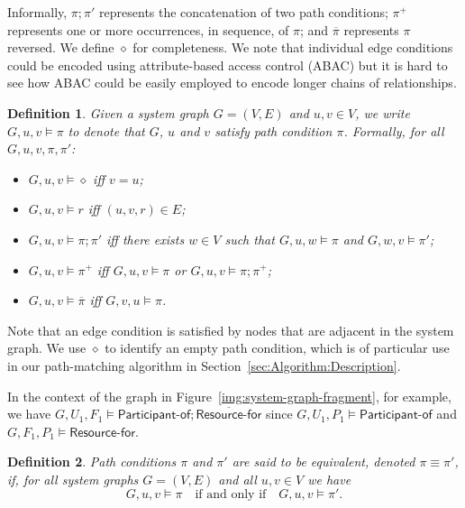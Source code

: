 \documentclass{article}
\newtheorem{definition}{Definition}
\newcommand{\comp}{\mathbin{;}}
\begin{document}
Informally, $\pi \comp \pi'$ represents the concatenation of two path conditions; $\pi^+$ represents one or more occurrences, in sequence, of $\pi$; and $\overline{\pi}$ represents $\pi$ reversed.
We define $\diamond$ for completeness.
We note that individual edge conditions could be encoded using attribute-based access control (ABAC) but it is hard to see how ABAC could be easily employed to encode longer chains of relationships.

\begin{definition}\label{def:path-condition-semantics}
 Given a system graph $G = (V,E)$ and $u,v \in V$, we write $G,u,v \models \pi$ to denote that  $G$, $u$ and $v$ \emph{satisfy path condition} $\pi$.
 Formally, for all $G,u,v,\pi,\pi'$:
    \begin{itemize}
        \item $G,u,v \models \diamond$ iff $v = u$;
        \item $G,u,v \models r$ iff $(u,v,r) \in E$;
        \item $G,u,v \models \pi \comp \pi'$ iff there exists $w \in V$ such that $G,u,w \models \pi$ and $G,w,v \models \pi'$;
        \item $G,u,v \models \pi^+$ iff $G,u,v \models \pi$ or $G,u,v \models \pi \comp \pi^+$;
        \item $G,u,v \models \overline{\pi}$ iff $G,v,u \models \pi$.
    \end{itemize}
\end{definition}

Note that an edge condition is satisfied by nodes that are adjacent in the system graph.
We use $\diamond$ to identify an empty path condition, which is of particular use in our path-matching algorithm in Section~\ref{sec:Algorithm:Description}.

In the context of the graph in Figure~\ref{img:system-graph-fragment}, for example, we have $G,U_1,F_1 \models \textsf{Participant-of} \comp \overline{\textsf{Resource-for}}$ since $G,U_1,P_1 \models \textsf{Participant-of}$ and $G,F_1,P_1 \models \textsf{Resource-for}$.

\begin{definition}\label{def:path-condition-equivalence}
 Path conditions $\pi$ and $\pi'$ are said to be \emph{equivalent}, denoted $\pi \equiv \pi'$, if, for all system graphs $G = (V,E)$ and all $u,v \in V$ we have
  \[
   G,u,v \models \pi \quad\text{if and only if} \quad G,u,v \models \pi'.
  \]
\end{definition}
\end{document}
